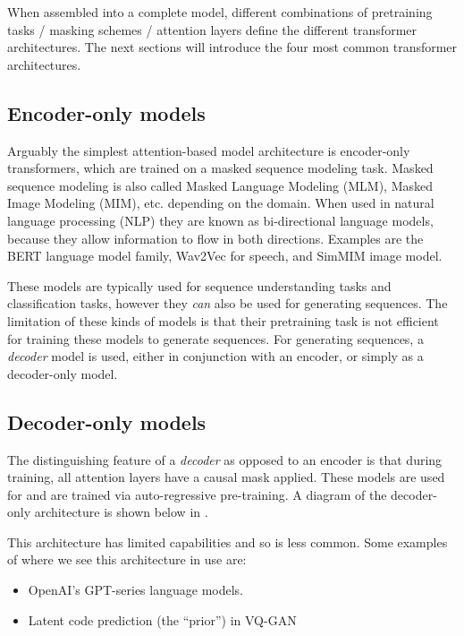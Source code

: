 When assembled into a complete model, different combinations of pretraining tasks / masking schemes / attention layers define the different transformer architectures. The next sections will introduce the four most common transformer architectures.

\subsection{Encoder-only models}
\label{ss:encoder-only}

Arguably the simplest attention-based model architecture is encoder-only transformers, which are trained on a masked sequence modeling task. Masked sequence modeling is also called Masked Language Modeling (MLM), Masked Image Modeling (MIM), etc. depending on the domain. When used in natural language processing (NLP) they are known as bi-directional language models, because they allow information to flow in both directions. Examples are the BERT \cite{bert} language model family, Wav2Vec \cite{wav2vec} for speech, and SimMIM \cite{sim-mim} image model.

These models are typically used for sequence understanding tasks and classification tasks, however they \textit{can} also be used for generating sequences. The limitation of these kinds of models is that their pretraining task is not efficient for training these models to generate sequences. For generating sequences, a \textit{decoder} model is used, either in conjunction with an encoder, or simply as a decoder-only model.

\subsection{Decoder-only models}
\label{ss:decoder-only}

The distinguishing feature of a \textit{decoder} as opposed to an encoder is that during training, all attention layers have a causal mask applied. These models are used for and are trained via auto-regressive pre-training. A diagram of the decoder-only architecture is shown below in .

This architecture has limited capabilities and so is less common. Some examples of where we see this architecture in use are:
\begin{itemize}
    \item OpenAI's GPT-series \cite{gpt2, gpt3} language models.
    \item Latent code prediction (the ``prior'') in VQ-GAN \cite{vqgan}
\end{itemize}

